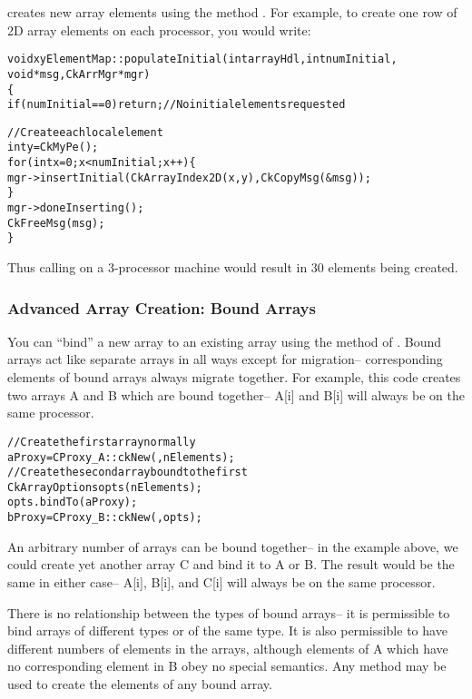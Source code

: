  creates new array elements using the method
.
For example, to create one row of 2D array elements on each processor,
you would write:

\begin{alltt}
void xyElementMap::populateInitial(int arrayHdl,int numInitial,
	void *msg,CkArrMgr *mgr)
\{
  if (numInitial==0) return; //No initial elements requested
	
  //Create each local element
  int y=CkMyPe();
  for (int x=0;x<numInitial;x++) \{
    mgr->insertInitial(CkArrayIndex2D(x,y),CkCopyMsg(&msg));
  \}
  mgr->doneInserting();
  CkFreeMsg(msg);
\}
\end{alltt}

Thus calling  on a 3-processor machine would result in
30 elements being created.


\subsubsection{Advanced Array Creation: Bound Arrays}

\experimental{}
 
\label{bound arrays}
You can ``bind'' a new array to an existing array
using the  method of .  Bound arrays
act like separate arrays in all ways except for migration--
corresponding elements of bound arrays always migrate together.
For example, this code creates two arrays A and B which are
bound together-- A[i] and B[i] will always be on the same processor.

\begin{alltt}
//Create the first array normally
  aProxy=CProxy_A::ckNew(,nElements);
//Create the second array bound to the first
  CkArrayOptions opts(nElements);
  opts.bindTo(aProxy);
  bProxy=CProxy_B::ckNew(,opts);
\end{alltt}

An arbitrary number of arrays can be bound together--
in the example above, we could create yet another array
C and bind it to A or B.  The result would be the same
in either case-- A[i], B[i], and C[i] will always be
on the same processor.

There is no relationship between the types of bound arrays--
it is permissible to bind arrays of different types or of the
same type.  It is also permissible to have different numbers
of elements in the arrays, although elements of A which have
no corresponding element in B obey no special semantics.
Any method may be used to create the elements of any bound
array.

